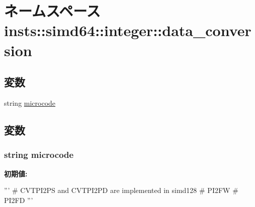 \hypertarget{namespaceinsts_1_1simd64_1_1integer_1_1data__conversion}{
\section{ネームスペース insts::simd64::integer::data\_\-conversion}
\label{namespaceinsts_1_1simd64_1_1integer_1_1data__conversion}
}
\subsection*{変数}
\begin{DoxyCompactItemize}
\item 
string \hyperlink{namespaceinsts_1_1simd64_1_1integer_1_1data__conversion_a770f11a173e99389a8802f0107ed8f52}{microcode}
\end{DoxyCompactItemize}


\subsection{変数}
\hypertarget{namespaceinsts_1_1simd64_1_1integer_1_1data__conversion_a770f11a173e99389a8802f0107ed8f52}{
\subsubsection[{microcode}]{\setlength{\rightskip}{0pt plus 5cm}string {\bf microcode}}}
\label{namespaceinsts_1_1simd64_1_1integer_1_1data__conversion_a770f11a173e99389a8802f0107ed8f52}
{\bfseries 初期値:}
\begin{DoxyCode}
'''
# CVTPI2PS and CVTPI2PD are implemented in simd128
# PI2FW
# PI2FD
'''
\end{DoxyCode}
